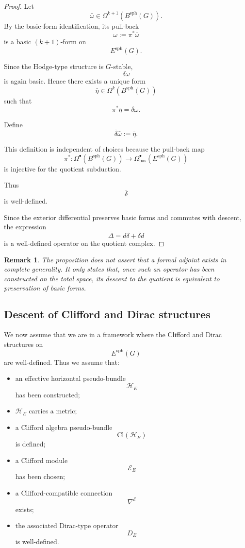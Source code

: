 \documentclass[11pt]{amsart}
\newtheorem{remark}[definition]{Remark}
\begin{document}
\begin{proof}
Let
\[
\bar\omega\in\Omega^{k+1}(B^{\mathrm{sph}}(G)).
\]
By the basic-form identification, its pull-back
\[
\omega:=\pi^*\bar\omega
\]
is a basic \((k+1)\)-form on
\[
E^{\mathrm{sph}}(G).
\]

Since the Hodge-type structure is \(G\)-stable,
\[
\delta\omega
\]
is again basic. Hence there exists a unique form
\[
\bar\eta\in\Omega^k(B^{\mathrm{sph}}(G))
\]
such that
\[
\pi^*\bar\eta=\delta\omega.
\]

Define
\[
\bar\delta\bar\omega:=\bar\eta.
\]

This definition is independent of choices because the pull-back map
\[
\pi^*:\Omega^\bullet(B^{\mathrm{sph}}(G))
\to
\Omega^\bullet_{\mathrm{bas}}(E^{\mathrm{sph}}(G))
\]
is injective for the quotient subduction.

Thus
\[
\bar\delta
\]
is well-defined.

Since the exterior differential preserves basic forms and commutes with
descent, the expression
\[
\bar\Delta=d\bar\delta+\bar\delta d
\]
is a well-defined operator on the quotient complex.
\end{proof}

\begin{remark}
The proposition does not assert that a formal adjoint exists in complete
generality. It only states that, once such an operator has been constructed on
the total space, its descent to the quotient is equivalent to preservation of
basic forms.
\end{remark}

\subsection{Descent of Clifford and Dirac structures}

We now assume that we are in a framework where the Clifford and Dirac
structures on
\[
E^{\mathrm{sph}}(G)
\]
are well-defined. Thus we assume that:
\begin{itemize}
\item an effective horizontal pseudo-bundle
\[
\mathcal H_E
\]
has been constructed;
\item \(\mathcal H_E\) carries a metric;
\item a Clifford algebra pseudo-bundle
\[
\mathrm{Cl}(\mathcal H_E)
\]
is defined;
\item a Clifford module
\[
\mathcal E_E
\]
has been chosen;
\item a Clifford-compatible connection
\[
\nabla^{\mathcal E}
\]
exists;
\item the associated Dirac-type operator
\[
D_E
\]
is well-defined.
\end{itemize}
\end{document}
